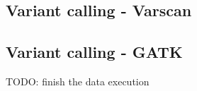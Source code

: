 \subsection{Variant calling - Varscan}

\subsection{Variant calling - GATK}

TODO: finish the data execution


%


%


% 
% 
